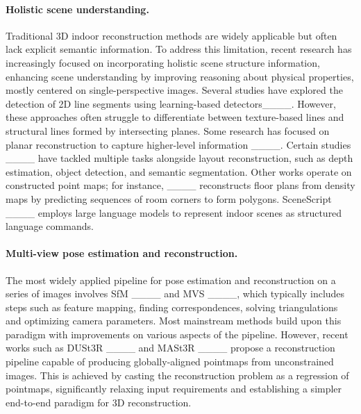 \paragraph{Holistic scene understanding.}
Traditional 3D indoor reconstruction methods are widely applicable but often lack explicit semantic information. To address this limitation, recent research has increasingly focused on incorporating holistic scene structure information, enhancing scene understanding by improving reasoning about physical properties, mostly centered on single-perspective images. Several studies have explored the detection of 2D line segments using learning-based detectors____. However, these approaches often struggle to differentiate between texture-based lines and structural lines formed by intersecting planes. Some research has focused on planar reconstruction to capture higher-level information ____. Certain studies ____ have tackled multiple tasks alongside layout reconstruction, such as depth estimation, object detection, and semantic segmentation.
Other works operate on constructed point maps; for instance, ____  reconstructs floor plans from density maps by predicting sequences of room corners to form polygons. SceneScript ____ employs large language models to represent indoor scenes as structured language commands.


\paragraph{Multi-view pose estimation and reconstruction.}
 The most widely applied pipeline for pose estimation and reconstruction on a series of images involves SfM ____ and MVS ____, which typically includes steps such as feature mapping, finding correspondences, solving triangulations and optimizing camera parameters. Most mainstream methods build upon this paradigm with improvements on various aspects of the pipeline. However, recent works such as DUSt3R ____ and MASt3R ____ propose a reconstruction pipeline capable of producing globally-aligned pointmaps from unconstrained images. This is achieved by casting the reconstruction problem as a regression of pointmaps, significantly relaxing input requirements and establishing a simpler end-to-end paradigm for 3D reconstruction.